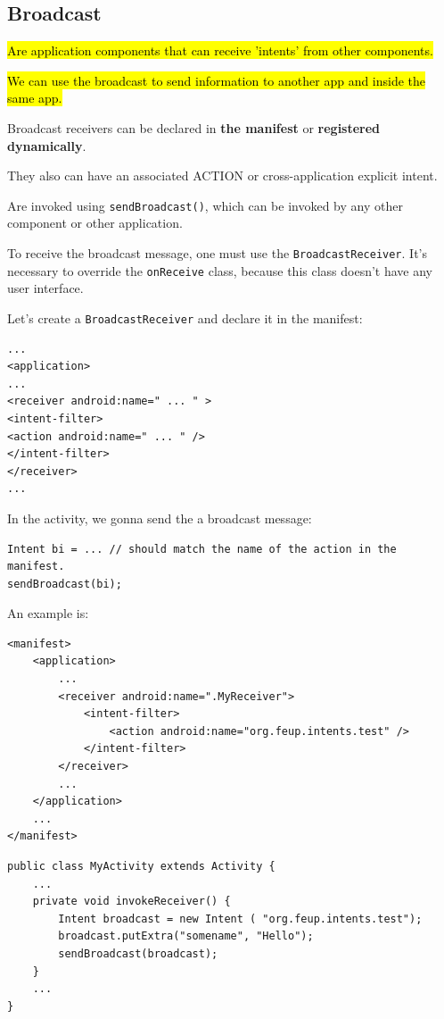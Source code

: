 \subsection{Broadcast}
\hl{Are application components that can receive 'intents' from other 
components.}

\hl{We can use the broadcast to send information to another app and inside the same app.}

Broadcast receivers can be declared in \textbf{the manifest} or 
\textbf{registered dynamically}. 

They also can have an associated ACTION or cross-application explicit 
intent. 

Are invoked using \texttt{sendBroadcast()}, which can be invoked by
any other component or other application. 

To receive the broadcast message, one must use the \texttt{BroadcastReceiver}. 
It's necessary to override the \texttt{onReceive} class, because this class
doesn't have any user interface. 

Let's create a \texttt{BroadcastReceiver} and declare it in the manifest:

\begin{lstlisting}
...
<application>
...
<receiver android:name=" ... " >
<intent-filter>
<action android:name=" ... " />
</intent-filter>
</receiver>
...
\end{lstlisting}

In the activity, we gonna send the a broadcast message:

\begin{lstlisting}
Intent bi = ... // should match the name of the action in the manifest. 
sendBroadcast(bi);
\end{lstlisting}

An example is: 
\begin{lstlisting}[title=Manifest definition]
<manifest>
    <application>
        ...
        <receiver android:name=".MyReceiver">
            <intent-filter>
                <action android:name="org.feup.intents.test" />
            </intent-filter>
        </receiver>
        ...
    </application>
    ...
</manifest>
\end{lstlisting}

\begin{lstlisting}[title=Broadcast activity]
public class MyActivity extends Activity {
    ...
    private void invokeReceiver() {
        Intent broadcast = new Intent ( "org.feup.intents.test");
        broadcast.putExtra("somename", "Hello");
        sendBroadcast(broadcast);
    }
    ...
}
\end{lstlisting}

